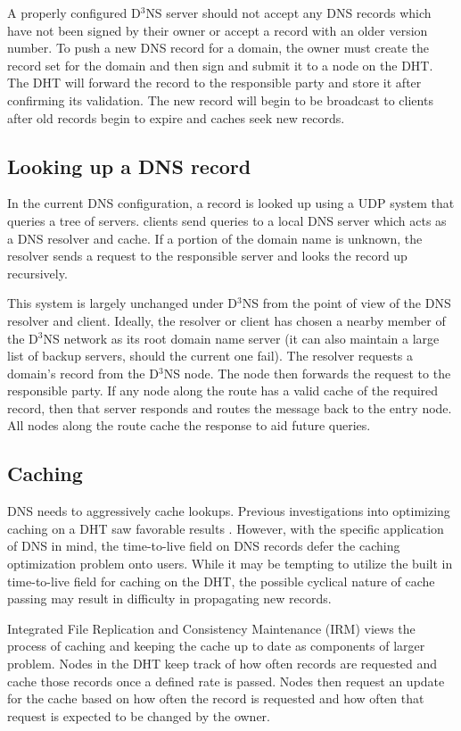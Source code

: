 A properly configured D$^3$NS server should not accept any DNS records which have not been signed by their owner or accept a record with an older version number. To push a new DNS record for a domain, the owner must create the record set for the domain and then sign and submit it to a node on the DHT. The DHT will forward the record to the responsible party and store it after confirming its validation. The new record will begin to be broadcast to clients after old records begin to expire and caches seek new records.

\subsection{Looking up a DNS record}
In the current DNS configuration, a record is looked up using a UDP system that queries a tree of servers. clients send queries to  a local DNS server which acts as a DNS resolver and cache. If a portion of the domain name is unknown, the resolver sends a request to the responsible server and looks the record up recursively.

This system is largely unchanged under D$^{3}$NS from the point of view of the DNS resolver and client. Ideally, the resolver or client has chosen a nearby member of the D$^{3}$NS network as its root domain name server (it can also maintain a large list of backup servers, should the current one fail). The resolver requests a domain's record from the D$^{3}$NS node. The node then forwards the request to the responsible party. If any node along the route has a valid cache of the required record, then that server responds and routes the message back to the entry node. All nodes along the route cache the response to aid future queries.

\subsection{Caching}
DNS needs to aggressively cache lookups. Previous investigations into optimizing caching on a DHT saw favorable results \cite{irm}. However, with the specific application of DNS in mind, the time-to-live field on DNS records defer the caching optimization problem onto users. 
While it may be tempting to utilize the built in time-to-live field for caching on the DHT, the possible cyclical nature of cache passing may result in difficulty in propagating new records.


Integrated File Replication and Consistency Maintenance (IRM) \cite{irm} views the process of caching and keeping the cache up to date as components of larger problem.  Nodes in the DHT keep track of how often records are requested and cache those records once a defined rate is passed.  Nodes then request an update for the cache based on how often the record is requested and how often that request is expected to be changed by the owner.


